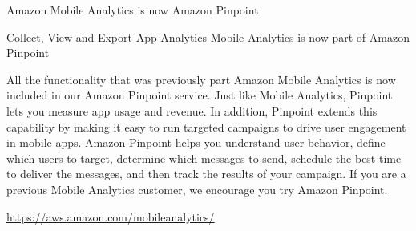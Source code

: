 Amazon Mobile Analytics is now Amazon Pinpoint

Collect, View and Export App Analytics
Mobile Analytics is now part of Amazon Pinpoint

All the functionality that was previously part Amazon Mobile Analytics is now included in our Amazon Pinpoint service. Just like Mobile Analytics, Pinpoint lets you measure app usage and revenue. In addition, Pinpoint extends this capability by making it easy to run targeted campaigns to drive user engagement in mobile apps. Amazon Pinpoint helps you understand user behavior, define which users to target, determine which messages to send, schedule the best time to deliver the messages, and then track the results of your campaign. If you are a previous Mobile Analytics customer, we encourage you try Amazon Pinpoint.

\url{https://aws.amazon.com/mobileanalytics/}

